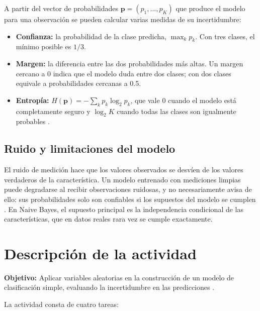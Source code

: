 \documentclass[11pt,letterpaper]{article}
\begin{document}
A partir del vector de probabilidades $\mathbf{p} = (p_1, \ldots, p_K)$ que produce el modelo para una observación se pueden calcular varias medidas de su incertidumbre:

\begin{itemize}
    \item \textbf{Confianza:} la probabilidad de la clase predicha, $\max_k p_k$. Con tres clases, el mínimo posible es $1/3$.
    \item \textbf{Margen:} la diferencia entre las dos probabilidades más altas. Un margen cercano a 0 indica que el modelo duda entre dos clases; con dos clases equivale a probabilidades cercanas a 0.5.
    \item \textbf{Entropía:} $H(\mathbf{p}) = -\sum_k p_k \log_2 p_k$, que vale 0 cuando el modelo está completamente seguro y $\log_2 K$ cuando todas las clases son igualmente probables \parencite{brownlee2020}.
\end{itemize}

\subsection{Ruido y limitaciones del modelo}

El ruido de medición hace que los valores observados se desvíen de los valores verdaderos de la característica. Un modelo entrenado con mediciones limpias puede degradarse al recibir observaciones ruidosas, y no necesariamente avisa de ello: sus probabilidades solo son confiables si los supuestos del modelo se cumplen \parencite{tecnm2026_documento_fuente,brownlee2020}. En Naive Bayes, el supuesto principal es la independencia condicional de las características, que en datos reales rara vez se cumple exactamente.

\section{Descripción de la actividad}

\textbf{Objetivo:} Aplicar variables aleatorias en la construcción de un modelo de clasificación simple, evaluando la incertidumbre en las predicciones \parencite{tecnm2026_documento_fuente}.

La actividad consta de cuatro tareas:
\end{document}
